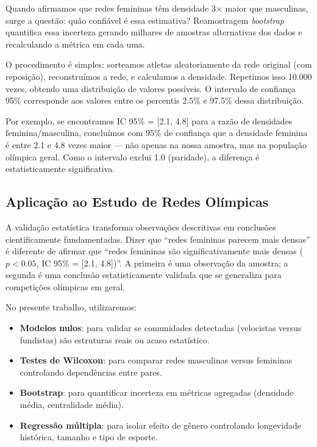 Quando afirmamos que redes femininas têm densidade 3× maior que masculinas, surge a questão: quão confiável é essa estimativa? Reamostragem \textit{bootstrap} \cite{VanderPlas2016Python} quantifica essa incerteza gerando milhares de amostras alternativas dos dados e recalculando a métrica em cada uma.

O procedimento é simples: sorteamos atletas aleatoriamente da rede original (com reposição), reconstruímos a rede, e calculamos a densidade. Repetimos isso 10.000 vezes, obtendo uma distribuição de valores possíveis. O intervalo de confiança 95\% corresponde aos valores entre os percentis 2.5\% e 97.5\% dessa distribuição.

Por exemplo, se encontramos IC 95\% = [2.1, 4.8] para a razão de densidades feminina/masculina, concluímos com 95\% de confiança que a densidade feminina é entre 2.1 e 4.8 vezes maior --- não apenas na nossa amostra, mas na população olímpica geral. Como o intervalo exclui 1.0 (paridade), a diferença é estatisticamente significativa.

\subsection{Aplicação ao Estudo de Redes Olímpicas}

A validação estatística transforma observações descritivas em conclusões cientificamente fundamentadas. Dizer que ``redes femininas parecem mais densas'' é diferente de afirmar que ``redes femininas são significativamente mais densas ($p < 0.05$, IC 95\% = [2.1, 4.8])''. A primeira é uma observação da amostra; a segunda é uma conclusão estatisticamente validada que se generaliza para competições olímpicas em geral.

No presente trabalho, utilizaremos:

\begin{itemize}
    \item \textbf{Modelos nulos}: para validar se comunidades detectadas (velocistas versus fundistas) são estruturas reais ou acaso estatístico.
    \item \textbf{Testes de Wilcoxon}: para comparar redes masculinas versus femininas controlando dependências entre pares.
    \item \textbf{Bootstrap}: para quantificar incerteza em métricas agregadas (densidade média, centralidade média).
    \item \textbf{Regressão múltipla}: para isolar efeito de gênero controlando longevidade histórica, tamanho e tipo de esporte.
\end{itemize}

